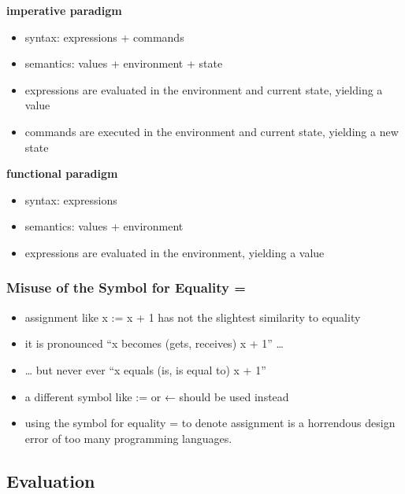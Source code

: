 \textbf{imperative paradigm}

\begin{itemize}
\tightlist
\item
  syntax: expressions + commands
\item
  semantics: values + environment + state
\item
  expressions are evaluated in the environment and current state,
  yielding a value
\item
  commands are executed in the environment and current state, yielding a
  new state
\end{itemize}

\textbf{functional paradigm}

\begin{itemize}
\tightlist
\item
  syntax: expressions
\item
  semantics: values + environment
\item
  expressions are evaluated in the environment, yielding a value
\end{itemize}

\hypertarget{misuse-of-the-symbol-for-equality}{%
\subsubsection{Misuse of the Symbol for Equality
=}\label{misuse-of-the-symbol-for-equality}}

\begin{itemize}
\tightlist
\item
  assignment like x := x + 1 has not the slightest similarity to
  equality
\item
  it is pronounced ``x becomes (gets, receives) x + 1'' \ldots{}
\item
  \ldots{} but never ever ``x equals (is, is equal to) x + 1''
\item
  a different symbol like := or ← should be used instead
\item
  using the symbol for equality = to denote assignment is a horrendous
  design error of too many programming languages.
\end{itemize}

\hypertarget{evaluation}{%
\subsection{Evaluation}\label{evaluation}}

